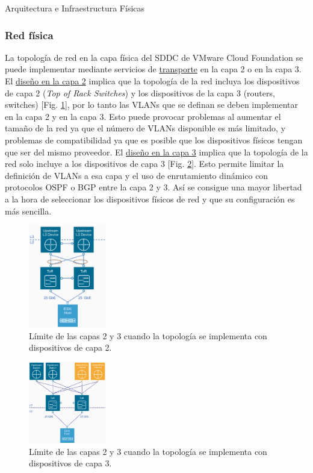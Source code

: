 \begin{subsection}{Arquitectura e Infraestructura Físicas \cite{CFfisInfraestuctura}}
\subsubsection{Red física}
La topología de red en la capa física del SDDC de VMware Cloud Foundation se puede implementar mediante servicios de \underline{transporte} en la capa 2 o en la capa 3. El \underline{diseño en la capa 2} implica que la topología de la red incluya los dispositivos de capa 2 (\textit{Top of Rack Switches}) y los dispositivos de la capa 3 (routers, switches) [Fig. \ref{fig:transportlayer2}], por lo tanto las VLANs que se definan se deben implementar en la capa 2 y en la capa 3. Esto puede provocar problemas al aumentar el tamaño de la red ya que el número de VLANs disponible es más limitado, y problemas de compatibilidad ya que es posible que los dispositivos físicos tengan que ser del mismo proveedor. El \underline{diseño en la capa 3} implica que la topología de la red solo incluye a los dispositivos de capa 3 [Fig. \ref{fig:transportlayer3}]. Esto permite limitar la definición de VLANs a esa capa y el uso de enrutamiento dinámico con protocolos OSPF o BGP entre la capa 2 y 3. Así se consigue una mayor libertad a la hora de seleccionar los dispositivos físicos de red y que su configuración es más sencilla.
\begin{figure}[h!]
  \centering
  \includegraphics[width=0.3\textwidth]{imaxes/conceptosPrevios/transportlayer2.png}
  \caption{Límite de las capas 2 y 3 cuando la topología se implementa con dispositivos de capa 2.}
  \label{fig:transportlayer2}
\end{figure}
\FloatBarrier
\begin{figure}[h!]
  \centering
  \includegraphics[width=0.3\textwidth]{imaxes/conceptosPrevios/transportNetLayer3.png}
  \caption{Límite de las capas 2 y 3 cuando la topología se implementa con dispositivos de capa 3.}
  \label{fig:transportlayer3}
\end{figure}
\FloatBarrier


\end{subsection}
